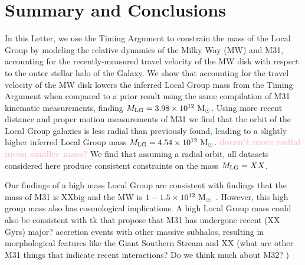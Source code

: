 \documentclass[twocolumn]{aastex631}
\newcommand{\kc}[1]{\textcolor{pink}{\textbf{#1}} }
\newcommand{\mlg}{\ensuremath{M_{\rm LG}}}
\begin{document}


\section{Summary and Conclusions}
\label{sec:summary}

In this Letter, we use the Timing Argument to constrain the mass of the Local
Group by modeling the relative dynamics of the Milky Way (MW) and M31,
accounting for the recently-measured travel velocity of the MW disk with respect
to the outer stellar halo of the Galaxy.
We show that accounting for the travel velocity of the MW disk lowers the
inferred Local Group mass from the Timing Argument when compared to a prior
result using the same compilation of M31 kinematic measurements, finding $\mlg =
3.98\times 10^{12}~\Msun$.
Using more recent distance and proper motion measurements of M31 we find that
the orbit of the Local Group galaxies is less radial than previously found,
leading to a slightly higher inferred Local Group mass $\mlg = 4.54\times10^{12}~\Msun$. \kc{doesn't more radial mean smaller mass? }
We find that assuming a radial orbit, all datasets considered here produce
consistent constraints on the mass $\mlg = XX$.

Our findings of a high mass Local Group are consistent with findings that the
mass of M31 is XXbig and the MW is $1-1.5\times10^{12}~\mathrm{M}_\odot$~\citep{??}.
However, this high group mass also has cosmological implications.
A high Local Group mass could also be consistent with tk that propose that M31
has undergone recent (XX Gyrs) major? accretion events with other massive
subhalos, resulting in morphological features like the Giant Southern Stream and
XX (what are other M31 things that indicate recent interactions? Do we think
much about M32? )
\end{document}
